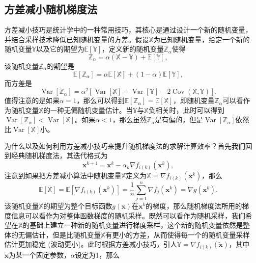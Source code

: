 \subsection{方差减小随机梯度法}
方差减小技巧是统计学中的一种常用技巧，其核心是通过设计一个新的随机变量，并结合采样技术降低已知随机变量的方差\cite{SVRG}。假设$\mathbb{X}$为已知随机变量，给定一个新的随机变量$\mathbb{Y}$以及它的期望为$\mathbb{E}[\mathbb{Y}]$，定义新的随机变量$\mathbb{Z}_{\alpha}$使得
\begin{equation}
    \mathbb{Z}_{\alpha}=\alpha(\mathbb{X}-\mathbb{Y})+\mathbb{E}[\mathbb{Y}],
    \nonumber
\end{equation}
该随机变量$\mathbb{Z}_{\alpha}$的期望是
\begin{equation}
    \mathbb{E}\left[\mathbb{Z}_{\alpha}\right]=\alpha \mathbb{E}[\mathbb{X}]+(1-\alpha) \mathbb{E}[\mathbb{Y}] ,
    \nonumber
\end{equation}
而方差是
\begin{equation}
    \operatorname{Var}\left[\mathbb{Z}_{\alpha}\right]=\alpha^{2}[\operatorname{Var}[\mathbb{X}]+\operatorname{Var}[\mathbb{Y}]-2 \operatorname{Cov}(\mathbb{X}, \mathbb{Y})] .
    \nonumber
\end{equation}
值得注意的是如果$\alpha=1$，那么可以得到$\mathbb{E}\left[\mathbb{Z}_{\alpha}\right]=\mathbb{E}[\mathbb{X}]$，即随机变量$\mathbb{Z}_{\alpha}$可以看作为随机变量$\mathbb{X}$的一种无偏随机变量估计。当$\mathbb{Y}$与$\mathbb{X}$负相关时，此时可以得到$\operatorname{Var}\left[\mathbb{Z}_{\alpha}\right]<\operatorname{Var}[\mathbb{X}]$。如果$\alpha<1$，那么虽然$\mathbb{Z}_{\alpha}$是有偏的，但是$\operatorname{Var}\left[\mathbb{Z}_{\alpha}\right]$依然比$\operatorname{Var}[\mathbb{X}]$小。
\par 为什么以及如何利用方差减小技巧来提升随机梯度法的求解计算效率？首先我们回到经典随机梯度法，其迭代格式为
\begin{equation}
    \bm{x}^{k+1}=\bm{x}^{k}-\alpha_{k} \nabla f_{i(k)}\left(\bm{x}^{k}\right) ,
    \nonumber
\end{equation}
注意到如果把方差减小算法中随机变量$\mathbb{X}$定义为$\mathbb{X}=\nabla f_{i(k)}\left(\bm{x}^{k}\right)$，那么
\begin{equation}
    \mathbb{E}[\mathbb{X}]=\mathbb{E}\left[\nabla f_{i(k)}\left(\bm{x}^{k}\right)\right]=\frac{1}{n} \sum_{j=1}^{n} \nabla f_{j}\left(\bm{x}^{k}\right)=\nabla g\left(\bm{x}^{k}\right) .
    \nonumber
\end{equation}
该随机变量$\mathbb{X}$的期望为整个目标函数$g(\bm{x})$在$\bm{x}^{k}$的梯度，那么随机梯度法所用的梯度信息可以看作为对整体函数梯度的随机采样。既然可以看作为随机采样，我们希望在$\mathbb{X}$的基础上建立一种新的随机变量进行梯度采样，这个新的随机变量依然是整体的无偏估计，但是比随机变量$\mathbb{X}$有更小的方差，从而使得每一个的随机变量采样估计更加稳定 (波动更小)。此时根据方差减小技巧，引人$\mathbb{Y}=\nabla f_{i(k)}(\tilde{\bm{x}})$，其中$\tilde{\bm{x}} $为某一个固定参数，$\alpha$设定为1，那么
